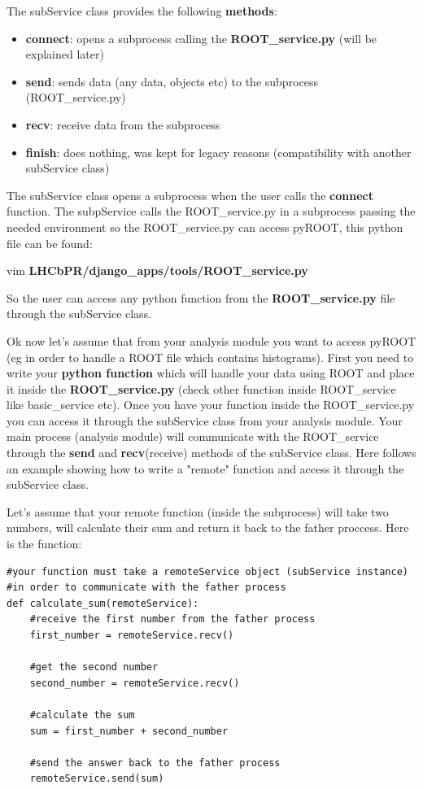 \documentclass{lhcbnote}
\begin{document}
The subService class provides the following \textbf{methods}:
\begin{itemize}
\item
\textbf{connect}: opens a subprocess calling the \textbf{ROOT\_service.py} (will be explained later)
\item
\textbf{send}: sends data (any data, objects etc) to the subprocess (ROOT\_service.py)
\item
\textbf{recv}: receive data from the subprocess
\item
\textbf{finish}: does nothing, was kept for legacy reasons (compatibility with another subService class) 
\end{itemize}

The subService class opens a subprocess when the user calls the \textbf{connect} function. The subpService calls the ROOT\_service.py in a subprocess passing the needed environment so the ROOT\_service.py can access pyROOT, this python file can be found:

vim \textbf{LHCbPR/django\_apps/tools/ROOT\_service.py}

\vspace {2 mm}

So the user can access any python function from the \textbf{ROOT\_service.py} file through the subService class. 

Ok now let's assume that from your analysis module you want to access pyROOT (eg in order to handle a ROOT file which contains histograms). First you need to write your \textbf{python function} which will handle your data using ROOT and place it inside the \textbf{ROOT\_service.py} (check other function inside ROOT\_service like basic\_service etc). Once you have your function inside the ROOT\_service.py you can access it through the subService class from your analysis module. Your main process (analysis module) will communicate with the ROOT\_service through the \textbf{send} and \textbf{recv}(receive) methods of the subService class. Here follows an example showing how to write a "remote" function and access it through the subService class.

\vspace {2 mm}
Let's assume that your remote function (inside the subprocess) will take two numbers, will calculate their sum and return it back to the father proccess. Here is the function:

\begin{verbatim}
#your function must take a remoteService object (subService instance)
#in order to communicate with the father process
def calculate_sum(remoteService):
    #receive the first number from the father process
    first_number = remoteService.recv()
    
    #get the second number
    second_number = remoteService.recv()
    
    #calculate the sum
    sum = first_number + second_number
    
    #send the answer back to the father process
    remoteService.send(sum)
    
\end{verbatim}
\end{document}
